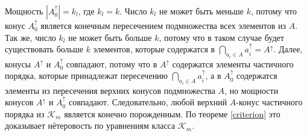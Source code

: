 \documentclass[12pt]{article}
\theoremstyle{break}
\def\K{\mathcal{K}_m}
\begin{document}
		Мощность $|A_0^{\uparrow}| = k_l$, где $k_l = k$. Число $k_l$ не может быть меньше $k$, потому что конус $A_0^{\uparrow}$ является конечным пересечением подмножества всех элементов из $A$. Так же, число $k_l$ не может быть больше $k$, потому что в таком случае будет существовать больше $k$ элементов, которые содержатся в $\bigcap_{a_i\in A}a_i^{\uparrow} = A^{\uparrow}.$ Далее, конусы $A^{\uparrow}$ и $A_0^{\uparrow}$ совпадают, потому что в $A^{\uparrow}$ содержатся элементы частичного порядка, которые принадлежат пересечению $\bigcap_{a_i\in A}a_i^{\uparrow}$, а в $A_0^{\uparrow}$ содержатся элементы из пересечения верхних конусов подмножества $A$, но мощности конусов $A^{\uparrow}$ и $A_0^{\uparrow}$ совпадают. Следовательно, любой верхний $A$-конус частичного порядка из $\K$ является конечно порожденным. По теореме \ref{criterion} это доказывает нётеровость по уравнениям класса $\K$.

		
	
\end{document}
